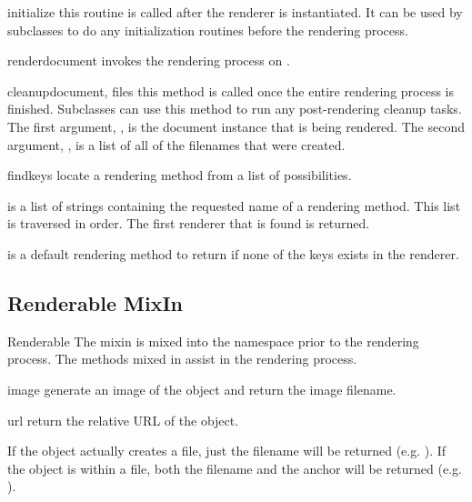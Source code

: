 \documentclass{manual}
\begin{document}
\begin{methoddesc}[Renderer]{initialize}{}
this routine is called after the renderer is instantiated.  It can be used
by subclasses to do any initialization routines before the rendering process.
\end{methoddesc}

\begin{methoddesc}[Renderer]{render}{document}
invokes the rendering process on .
\end{methoddesc}

\begin{methoddesc}[Renderer]{cleanup}{document, files}
this method is called once the entire rendering process is finished.  
Subclasses can use this method to run any post-rendering cleanup tasks.
The first argument, , is the document instance that is
being rendered.  The second argument, , is a list of all of the
filenames that were created.
\end{methoddesc}

\begin{methoddesc}[Renderer]{find}{keys}
locate a rendering method from a list of possibilities.  

 is a list of strings containing the requested name of a
rendering method.  This list is traversed in order.  The first renderer
that is found is returned.

 is a default rendering method to return if none of the keys
exists in the renderer.
\end{methoddesc}


\subsection{Renderable MixIn}

\begin{classdesc}{Renderable}{}
The  mixin is mixed into the  namespace
prior to the rendering process.  The methods mixed in assist in the 
rendering process.
\end{classdesc}

\begin{memberdesc}[Renderable]{image}
generate an image of the object and return the image filename.
\end{memberdesc}

\begin{memberdesc}[Renderable]{url}
return the relative URL of the object.  

If the object actually creates a file, just the filename will
be returned (e.g. ).  If the object is within a file, 
both the filename and the anchor will be returned 
(e.g. ).
\end{memberdesc}
\end{document}
